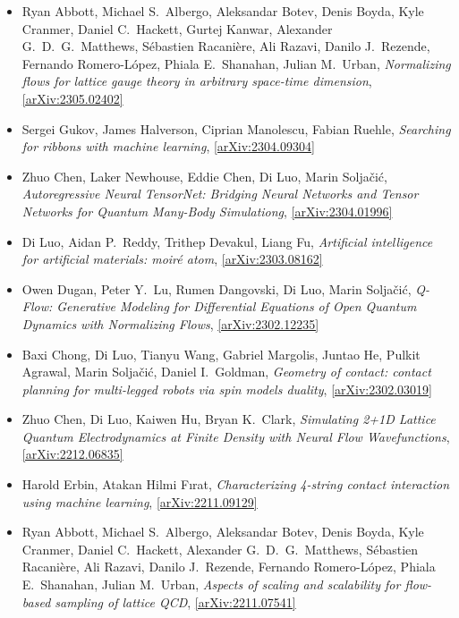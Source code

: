 \begin{itemize}
\item Ryan Abbott, Michael S.\  Albergo, Aleksandar Botev, Denis Boyda, Kyle Cranmer, Daniel C.\  Hackett, Gurtej Kanwar, Alexander G.\ D.\ G.\  Matthews, Sébastien Racanière, Ali Razavi, Danilo J.\  Rezende, Fernando Romero-López, Phiala E.\  Shanahan, Julian M.\  Urban, \textit{Normalizing flows for lattice gauge theory in arbitrary space-time dimension}, \href{https://arxiv.org/abs/2305.02402}{[arXiv:2305.02402]} 
\item Sergei Gukov, James Halverson, Ciprian Manolescu, Fabian Ruehle, \textit{Searching for ribbons with machine learning}, \href{https://arxiv.org/abs/2304.09304}{[arXiv:2304.09304]} 
\item Zhuo Chen, Laker Newhouse, Eddie Chen, Di Luo, Marin Soljačić, \textit{Autoregressive Neural TensorNet: Bridging Neural Networks and Tensor Networks for Quantum Many-Body Simulationg}, \href{https://arxiv.org/abs/2304.01996}{[arXiv:2304.01996]} 
\item Di Luo, Aidan P.\  Reddy, Trithep Devakul, Liang Fu, \textit{Artificial intelligence for artificial materials: moiré atom}, \href{https://arxiv.org/abs/2303.08162}{[arXiv:2303.08162]} 
\item Owen Dugan, Peter Y.\  Lu, Rumen Dangovski, Di Luo, Marin Soljačić, \textit{Q-Flow: Generative Modeling for Differential Equations of Open Quantum Dynamics with Normalizing Flows}, \href{https://arxiv.org/abs/2302.12235}{[arXiv:2302.12235]} 
\item Baxi Chong, Di Luo, Tianyu Wang, Gabriel Margolis, Juntao He, Pulkit Agrawal, Marin Soljačić, Daniel I.\  Goldman, \textit{Geometry of contact: contact planning for multi-legged robots via spin models duality}, \href{https://arxiv.org/abs/2302.03019}{[arXiv:2302.03019]} 
\item Zhuo Chen, Di Luo, Kaiwen Hu, Bryan K.\  Clark, \textit{Simulating 2+1D Lattice Quantum Electrodynamics at Finite Density with Neural Flow Wavefunctions}, \href{https://arxiv.org/abs/2212.06835}{[arXiv:2212.06835]} 
\item Harold Erbin, Atakan Hilmi Fırat, \textit{Characterizing 4-string contact interaction using machine learning}, \href{https://arxiv.org/abs/2211.09129}{[arXiv:2211.09129]} 
\item Ryan Abbott, Michael S.\  Albergo, Aleksandar Botev, Denis Boyda, Kyle Cranmer, Daniel C.\  Hackett, Alexander G.\  D.\  G.\  Matthews, Sébastien Racanière, Ali Razavi, Danilo J.\  Rezende, Fernando Romero-López, Phiala E.\  Shanahan, Julian M.\  Urban, \textit{Aspects of scaling and scalability for flow-based sampling of lattice QCD}, \href{https://arxiv.org/abs/2211.07541}{[arXiv:2211.07541]} 

\end{itemize}
